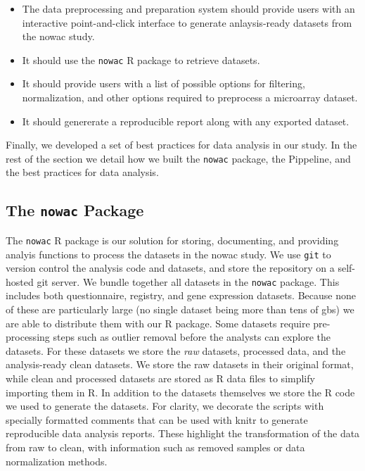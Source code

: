 \begin{itemize} 
    \item The data preprocessing and preparation system should provide users
        with an interactive point-and-click interface to generate anlaysis-ready
        datasets from the \gls{nowac} study. 
    \item It should use the \texttt{nowac} R package to retrieve datasets. 
    \item It should provide users with a list of possible options for filtering,
        normalization, and other options required to preprocess a microarray
        dataset.
    \item It should genererate a reproducible report along with any exported
        dataset.
\end{itemize} 

Finally, we developed a set of best practices for data analysis in our study. In
the rest of the section we detail how we built the \texttt{nowac} package, the
Pippeline, and the best practices for data analysis. 

\subsection{The \texttt{nowac} Package} 
The \texttt{nowac} R package is our solution for storing, documenting, and
providing analyis functions to process the datasets in the \gls{nowac} study. We
use \texttt{git} to version control the analysis code and datasets, and store
the repository on a self-hosted git server.  We bundle together all datasets in
the \texttt{nowac} package. This includes both questionnaire, registry, and gene
expression datasets. Because none of these are particularly large (no single
dataset being more than tens of \glspl{gb}) we are able to distribute them with
our R package. Some datasets require pre-processing steps such as outlier
removal before the analysts can explore the datasets. For these datasets we
store the \emph{raw} datasets, processed data, and the analysis-ready clean
datasets. We store the raw datasets in their original format, while clean and
processed datasets are stored as R data files to simplify importing them in R.
In addition to the datasets themselves we store the R code we used to generate
the datasets.  For clarity, we decorate the scripts with specially formatted
comments that can be used with knitr\cite{xie2016dynamic} to generate
reproducible data analysis reports. These highlight the transformation of the
data from raw to clean, with information such as removed samples or data
normalization methods. 

